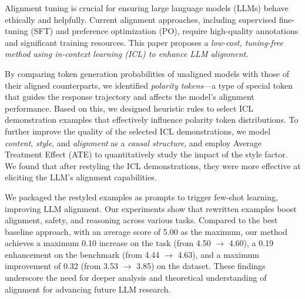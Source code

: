 \quad Alignment tuning is crucial for ensuring large language models (LLMs) behave ethically and helpfully. 
Current alignment approaches, including supervised fine-tuning (SFT) and preference optimization (PO), require high-quality annotations and significant training resources. 
This paper proposes a \textit{low-cost, tuning-free method using in-context learning (ICL) to enhance LLM alignment}.

\quad By comparing token generation probabilities of unaligned models with those of their aligned counterparts, we identified \textit{polarity tokens}—a type of special token that guides the response trajectory and affects the model’s alignment performance.
%
%
Based on this, we designed heuristic rules to select ICL demonstration examples that effectively influence polarity token distributions.
%
To further improve the quality of the selected ICL demonstrations, we model \textit{content}, \textit{style}, and \textit{alignment} as a \textit{causal structure}, and employ Average Treatment Effect (ATE) to quantitatively study the impact of the style factor. 
We found that after restyling the ICL demonstrations, they were more effective at eliciting the LLM’s alignment capabilities.


\quad We packaged the restyled examples as prompts to trigger few-shot learning, improving LLM alignment. Our experiments show that rewritten examples boost alignment, safety, and reasoning across various tasks.
Compared to the best baseline approach, with an average score of 5.00 as the maximum, our method achieves a maximum 0.10 increase on the \alpaca{} task (from 4.50 $\to$ 4.60), a 0.19 enhancement on the \dataname{} benchmark (from 4.44 $\to$ 4.63), and a maximum improvement of 0.32 (from 3.53 $\to$ 3.85) on the \mtbench{} dataset.
These findings underscore the need for deeper analysis and theoretical understanding of alignment for advancing future LLM research.